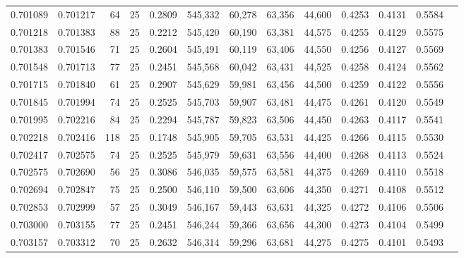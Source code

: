 \begin{tabular}{rrrrrrrrrrrrr}
0.701089 & 0.701217 &    64 &  25 &                                     0.2809 & 545,332 &  60,278 &  63,356 &  44,600 & 0.4253 & 0.4131 & 0.5584 \\
0.701218 & 0.701383 &    88 &  25 &                                     0.2212 & 545,420 &  60,190 &  63,381 &  44,575 & 0.4255 & 0.4129 & 0.5575 \\
0.701383 & 0.701546 &    71 &  25 &                                     0.2604 & 545,491 &  60,119 &  63,406 &  44,550 & 0.4256 & 0.4127 & 0.5569 \\
0.701548 & 0.701713 &    77 &  25 &                                     0.2451 & 545,568 &  60,042 &  63,431 &  44,525 & 0.4258 & 0.4124 & 0.5562 \\
0.701715 & 0.701840 &    61 &  25 &                                     0.2907 & 545,629 &  59,981 &  63,456 &  44,500 & 0.4259 & 0.4122 & 0.5556 \\
0.701845 & 0.701994 &    74 &  25 &                                     0.2525 & 545,703 &  59,907 &  63,481 &  44,475 & 0.4261 & 0.4120 & 0.5549 \\
0.701995 & 0.702216 &    84 &  25 &                                     0.2294 & 545,787 &  59,823 &  63,506 &  44,450 & 0.4263 & 0.4117 & 0.5541 \\
0.702218 & 0.702416 &   118 &  25 &                                     0.1748 & 545,905 &  59,705 &  63,531 &  44,425 & 0.4266 & 0.4115 & 0.5530 \\
0.702417 & 0.702575 &    74 &  25 &                                     0.2525 & 545,979 &  59,631 &  63,556 &  44,400 & 0.4268 & 0.4113 & 0.5524 \\
0.702575 & 0.702690 &    56 &  25 &                                     0.3086 & 546,035 &  59,575 &  63,581 &  44,375 & 0.4269 & 0.4110 & 0.5518 \\
0.702694 & 0.702847 &    75 &  25 &                                     0.2500 & 546,110 &  59,500 &  63,606 &  44,350 & 0.4271 & 0.4108 & 0.5512 \\
0.702853 & 0.702999 &    57 &  25 &                                     0.3049 & 546,167 &  59,443 &  63,631 &  44,325 & 0.4272 & 0.4106 & 0.5506 \\
0.703000 & 0.703155 &    77 &  25 &                                     0.2451 & 546,244 &  59,366 &  63,656 &  44,300 & 0.4273 & 0.4104 & 0.5499 \\
0.703157 & 0.703312 &    70 &  25 &                                     0.2632 & 546,314 &  59,296 &  63,681 &  44,275 & 0.4275 & 0.4101 & 0.5493 \\

\end{tabular}
